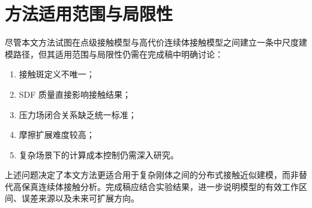 \section{方法适用范围与局限性}
尽管本文方法试图在点级接触模型与高代价连续体接触模型之间建立一条中尺度建模路径，但其适用范围与局限性仍需在完成稿中明确讨论：
\begin{enumerate}[label=(\arabic*)]
    \item 接触斑定义不唯一；
    \item SDF 质量直接影响接触结果；
    \item 压力场闭合关系缺乏统一标准；
    \item 摩擦扩展难度较高；
    \item 复杂场景下的计算成本控制仍需深入研究。
\end{enumerate}

上述问题决定了本文方法更适合用于复杂刚体之间的分布式接触近似建模，而非替代高保真连续体接触分析。完成稿应结合实验结果，进一步说明模型的有效工作区间、误差来源以及未来可扩展方向。
